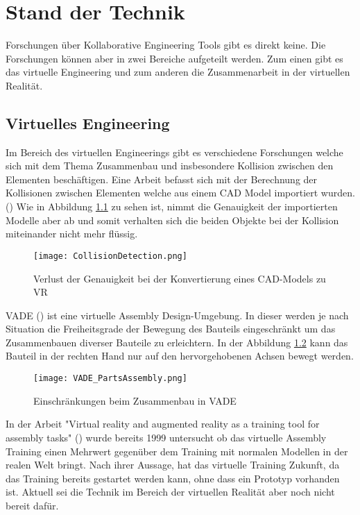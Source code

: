 \chapter{Stand der Technik}
\label{ch:StandDerTechnik}

Forschungen über Kollaborative Engineering Tools gibt es direkt keine. Die Forschungen können aber in zwei Bereiche aufgeteilt werden. Zum einen gibt es das virtuelle Engineering und zum anderen die Zusammenarbeit in der virtuellen Realität.

\section{Virtuelles Engineering}

Im Bereich des virtuellen Engineerings gibt es verschiedene Forschungen welche sich mit dem Thema Zusammenbau und insbesondere Kollision zwischen den Elementen beschäftigen.
Eine Arbeit befasst sich mit der Berechnung der Kollisionen zwischen Elementen welche aus einem CAD Model importiert wurden. (\cite{tching_interactive_2010})
Wie in Abbildung \ref{fig:LossOfAccuracy} zu sehen ist, nimmt die Genauigkeit der importierten Modelle aber ab und somit verhalten sich die beiden Objekte bei der Kollision miteinander nicht mehr flüssig.

\begin{figure}[h!]
	\centering
	\texttt{[image: CollisionDetection.png]}
	\caption{Verlust der Genauigkeit bei der Konvertierung eines CAD-Models zu VR}
	\label{fig:LossOfAccuracy}
\end{figure}

\noindent VADE (\cite{tirumali_vade:_1999}) ist eine virtuelle Assembly Design-Umgebung. In dieser werden je nach Situation die Freiheitsgrade der Bewegung des Bauteils eingeschränkt um das Zusammenbauen diverser Bauteile zu erleichtern. 
In der Abbildung \ref{fig:VADEAssembly} kann das Bauteil in der rechten Hand nur auf den hervorgehobenen Achsen bewegt werden. \\

\begin{figure}[h!]
	\centering
	\texttt{[image: VADE\_PartsAssembly.png]}
	\caption{Einschränkungen beim Zusammenbau in VADE}
	\label{fig:VADEAssembly}
\end{figure}

\noindent In der Arbeit "Virtual reality and augmented reality as a training tool for assembly tasks" (\cite{boud_virtual_1999}) wurde bereits 1999 untersucht ob das virtuelle Assembly Training einen Mehrwert gegenüber dem Training mit normalen Modellen in der realen Welt bringt. Nach ihrer Aussage, hat das virtuelle Training Zukunft, da das Training bereits gestartet werden kann, ohne dass ein Prototyp vorhanden ist. Aktuell sei die Technik im Bereich der virtuellen Realität aber noch nicht bereit dafür. 

